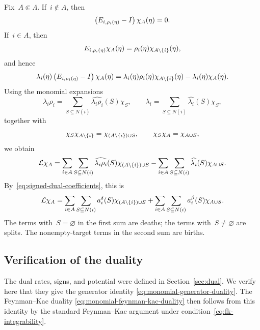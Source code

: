 \documentclass[EJP,preprint,NODS,nobera]{ejpecp}
\begin{document}
Fix~$A\Subset\Lambda$. If~$i\notin A$, then
\begin{equation*}
\left(E_{i,\rho_i(\eta)}-I\right)\chi_A(\eta)=0.
\end{equation*}
If~$i\in A$, then
\begin{equation*}
E_{i,\rho_i(\eta)}\chi_A(\eta)
=
\rho_i(\eta)\chi_{A\setminus\left\{i\right\}}(\eta),
\end{equation*}
and hence
\begin{equation*}
\lambda_i(\eta)\left(E_{i,\rho_i(\eta)}-I\right)\chi_A(\eta)
=
\lambda_i(\eta)\rho_i(\eta)\chi_{A\setminus\left\{i\right\}}(\eta)
-
\lambda_i(\eta)\chi_A(\eta).
\end{equation*}
Using the monomial expansions
\begin{equation*}
\lambda_i\rho_i
=
\sum_{S\subseteq N(i)}\widehat{\lambda_i\rho_i}(S)\chi_S,
\qquad
\lambda_i
=
\sum_{S\subseteq N(i)}\widehat{\lambda_i}(S)\chi_S,
\end{equation*}
together with
\begin{equation*}
\chi_S\chi_{A\setminus\left\{i\right\}}
=
\chi_{\left(A\setminus\left\{i\right\}\right)\cup S},
\qquad
\chi_S\chi_A=\chi_{A\cup S},
\end{equation*}
we obtain
\begin{equation*}
\mathcal{L}\chi_A
=
\sum_{i\in A}\sum_{S\subseteq N(i)}
\widehat{\lambda_i\rho_i}(S)
\chi_{\left(A\setminus\left\{i\right\}\right)\cup S}-
\sum_{i\in A}\sum_{S\subseteq N(i)}
\widehat{\lambda_i}(S)\chi_{A\cup S}.
\end{equation*}
By~\eqref{eq:signed-dual-coefficients}, this is
\begin{equation}
\label{eq:generator-action-monomials}
\mathcal{L}\chi_A
=
\sum_{i\in A}\sum_{S\subseteq N(i)}
a_i^\delta(S)\chi_{\left(A\setminus\left\{i\right\}\right)\cup S}
+
\sum_{i\in A}\sum_{S\subseteq N(i)}
a_i^\beta(S)\chi_{A\cup S}.
\end{equation}
The terms with~$S=\varnothing$ in the first sum are deaths; the terms
with~$S\neq\varnothing$ are splits. The nonempty-target terms in the second sum
are births.

\subsection{Verification of the duality}
\label{app:dual-data}

The dual rates, signs, and potential were defined in
Section~\ref{sec:dual}. We verify here that they give the generator identity
\eqref{eq:monomial-generator-duality}. The Feynman--Kac duality
\eqref{eq:monomial-feynman-kac-duality} then follows from this identity by the
standard Feynman--Kac argument under condition~\eqref{eq:fk-integrability}.
\end{document}
